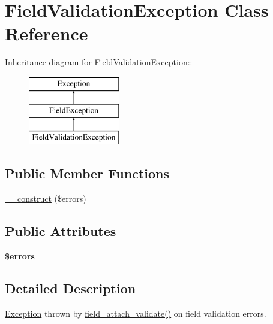 \hypertarget{classFieldValidationException}{
\section{FieldValidationException Class Reference}
\label{classFieldValidationException}
}
Inheritance diagram for FieldValidationException::\begin{figure}[H]
\begin{center}
\leavevmode
\includegraphics[height=3cm]{classFieldValidationException}
\end{center}
\end{figure}
\subsection*{Public Member Functions}
\begin{DoxyCompactItemize}
\item 
\hyperlink{classFieldValidationException_a9d96242a9e8d70ef4c9e614efed09a57}{\_\-\_\-construct} (\$errors)
\end{DoxyCompactItemize}
\subsection*{Public Attributes}
\begin{DoxyCompactItemize}
\item 
\hypertarget{classFieldValidationException_aaf29ec33b0466c7d35bb9ae8a5c85016}{
{\bfseries \$errors}}
\label{classFieldValidationException_aaf29ec33b0466c7d35bb9ae8a5c85016}

\end{DoxyCompactItemize}


\subsection{Detailed Description}
\hyperlink{classException}{Exception} thrown by \hyperlink{group__field__attach_gae56981a9c1006e9c54f695f0ed515cd1}{field\_\-attach\_\-validate()} on field validation errors. 

